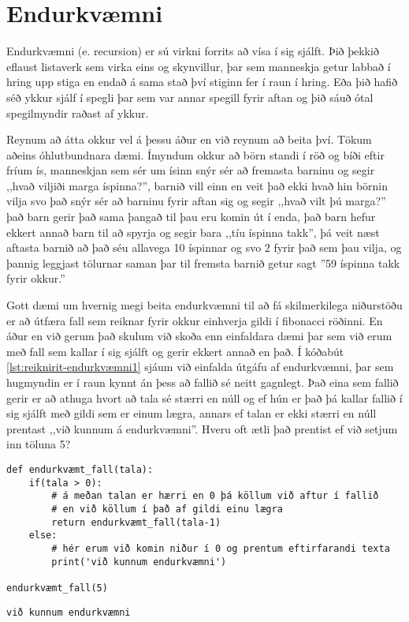 \section{Endurkvæmni}\label{uk:reiknirit-endurkvæmni}
Endurkvæmni (e. recursion) er sú virkni forrits að vísa í sig sjálft.
Þið þekkið eflaust listaverk sem virka eins og skynvillur, þar sem manneskja getur labbað í hring upp stiga en endað á sama stað því stiginn fer í raun í hring. 
Eða þið hafið séð ykkur sjálf í spegli þar sem var annar spegill fyrir aftan og þið sáuð ótal spegilmyndir raðast af ykkur.

Reynum að átta okkur vel á þessu áður en við reynum að beita því.
Tökum aðeins óhlutbundnara dæmi.
Ímyndum okkur að börn standi í röð og bíði eftir fríum ís, manneskjan sem sér um ísinn snýr sér að fremasta barninu og segir ,,hvað viljiði marga íspinna?'', barnið vill einn en veit það ekki hvað hin börnin vilja svo það snýr sér að barninu fyrir aftan sig og segir ,,hvað vilt þú marga?'' það barn gerir það sama þangað til þau eru komin út í enda, það barn hefur ekkert annað barn til að spyrja og segir bara ,,tíu íspinna takk'', þá veit næst aftasta barnið að það séu allavega 10 íspinnar og svo 2 fyrir það sem þau vilja, og þannig leggjast tölurnar saman þar til fremsta barnið getur sagt ''59 íspinna takk fyrir okkur.''

Gott dæmi um hvernig megi beita endurkvæmni til að fá skilmerkilega niðurstöðu er að útfæra fall sem reiknar fyrir okkur einhverja gildi í fibonacci röðinni.
En áður en við gerum það skulum við skoða enn einfaldara dæmi þar sem við erum með fall sem kallar í sig sjálft og gerir ekkert annað en það.
Í kóðabút \ref{lst:reiknirit-endurkvæmni1} sjáum við einfalda útgáfu af endurkvæmni, þar sem hugmyndin er í raun kynnt án þess að fallið sé neitt gagnlegt.
Það eina sem fallið gerir er að athuga hvort að tala sé stærri en núll og ef hún er það þá kallar fallið í sig sjálft með gildi sem er einum lægra, annars ef talan er ekki stærri en núll prentast ,,við kunnum á endurkvæmni''.
Hveru oft ætli það prentist ef við setjum inn töluna 5?

\begin{lstlisting}[caption=Endurkvæmni - einfalt, label=lst:reiknirit-endurkvæmni1]
def endurkvæmt_fall(tala):
	if(tala > 0):
		# á meðan talan er hærri en 0 þá köllum við aftur í fallið
		# en við köllum í það af gildi einu lægra
		return endurkvæmt_fall(tala-1)
	else:
		# hér erum við komin niður í 0 og prentum eftirfarandi texta
		print('við kunnum endurkvæmni')
		
endurkvæmt_fall(5)
\end{lstlisting}
\lstset{style=uttak}
\begin{lstlisting}
við kunnum endurkvæmni
\end{lstlisting}
\lstset{style=venjulegt}

